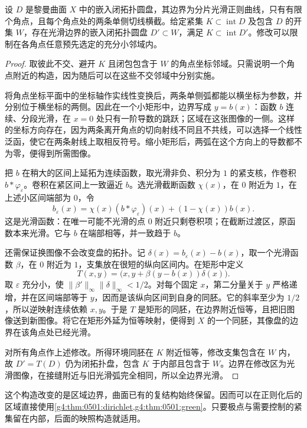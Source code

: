 \begin{lemma}
	\label{g4:lem:0502:round-corners}
	设 \(D\) 是黎曼曲面 \(X\) 中的嵌入闭拓扑圆盘，其边界为分片光滑正则曲线，只有有限个角点，且每个角点处的两条单侧切线横截。给定紧集 \(K\subset\operatorname{int}D\) 及包含 \(D\) 的开集 \(W\)，存在光滑边界的嵌入闭拓扑圆盘 \(D'\subset W\)，满足 \(K\subset\operatorname{int}D'\)。修改可以限制在各角点任意预先选定的充分小邻域内。
\end{lemma}
\begin{proof}
	取彼此不交、避开 \(K\) 且闭包包含于 \(W\) 的角点坐标邻域。只需说明一个角点附近的构造，因为随后可以在这些不交邻域中分别实施。

	将角点坐标平面中的坐标轴作实线性变换后，两条单侧弧都能以横坐标为参数，并分别位于横坐标的两侧。因此在一个小矩形中，边界写成 \(y=b(x)\)：函数 \(b\) 连续、分段光滑，在 \(x=0\) 处只有一阶导数的跳跃；区域在这张图像的一侧。这样的坐标方向存在，因为两条离开角点的切向射线不同且不共线，可以选择一个线性泛函，使它在两条射线上取相反符号。缩小矩形后，两弧在这个方向上的导数都不为零，便得到所需图像。

	把 \(b\) 在稍大的区间上延拓为连续函数，取光滑非负、积分为 \(1\) 的紧支核，作卷积 \(b*\varphi_\varepsilon\)。卷积在紧区间上一致逼近 \(b\)。选光滑截断函数 \(\chi(x)\)，在 \(0\) 附近为 \(1\)，在上述小区间端部为 \(0\)，令
	\[
		b_\varepsilon(x)=\chi(x)(b*\varphi_\varepsilon)(x)
		+(1-\chi(x))b(x).
	\]
	这是光滑函数：在唯一可能不光滑的点 \(0\) 附近只剩卷积项；在截断过渡区，原函数本来光滑。它与 \(b\) 在端部相等，并一致趋于 \(b\)。

	还需保证换图像不会改变盘的拓扑。记 \(\delta(x)=b_\varepsilon(x)-b(x)\)，取一个光滑函数 \(\beta\)，在 \(0\) 附近为 \(1\)，支集放在很短的纵向区间内。在矩形中定义
	\[
		T(x,y)=\bigl(x,y+\beta(y-b(x))\delta(x)\bigr).
	\]
	取 \(\varepsilon\) 充分小，使 \(\|\beta'\|_\infty\|\delta\|_\infty<1/2\)。对每个固定 \(x\)，第二分量关于 \(y\) 严格递增，并在区间端部等于 \(y\)，因而是该纵向区间到自身的同胚。它的斜率至少为 \(1/2\)，所以逆映射连续依赖 \(x,y\)。于是 \(T\) 是矩形的同胚，在边界附近恒等，且把旧图像送到新图像。将它在矩形外延为恒等映射，便得到 \(X\) 的一个同胚，其像盘的边界在该角点处已经光滑。

	对所有角点作上述修改。所得环境同胚在 \(K\) 附近恒等，修改支集包含在 \(W\) 内，故 \(D'=T(D)\) 仍为闭拓扑盘，包含 \(K\) 于内部且包含于 \(W\)。边界在修改区为光滑图像，在接缝附近与旧光滑弧完全相同，所以全边界光滑。
\end{proof}

这个构造改变的是区域边界，曲面已有的复结构始终保留。因而可以在正则化后的区域直接使用\cref{g4:thm:0501:dirichlet,g4:thm:0501:green}。只要极点与需要控制的紧集留在内部，后面的映照构造就适用。

